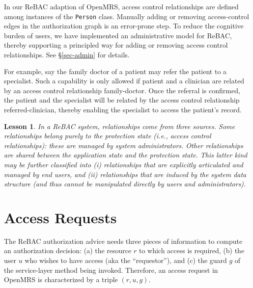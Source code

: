 \documentclass{acm_proc_article-sp}
\newcommand{\textcode}[1]{\texttt{#1}}
\newtheorem{lesson}{Lesson}
\begin{document}
\begin{compactenum}
  In our ReBAC adaption of OpenMRS, access control relationships are
  defined among instances of the \textcode{Person} class.  Manually
  adding or removing access-control edges in the authorization graph
  is an error-prone step.  To reduce the cognitive burden of users, we
  have implemented an administrative model for ReBAC, thereby
  supporting a principled way for adding or removing access control
  relationships.  See \S \ref{sec-admin} for details.

  For example, say the family doctor of a patient may refer the
  patient to a specialist.  Such a capability is only allowed if
  patient and a clinician are related by an access control relationship
  \textsf{family-doctor}.  Once the referral is confirmed, the patient
  and the specialist will be related by the access control
  relationship \textsf{referred-clinician}, thereby enabling the
  specialist to access the patient's record.
\end{compactenum}
\begin{lesson}
  In a ReBAC system, relationships come from three sources.  Some
  relationships belong purely to the protection state (i.e., access
  control relationships): these are managed by system administrators.
  Other relationships are shared between the application state and the
  protection state.  This latter kind may be further classified into
  (i) relationships that are explicitly articulated and managed by end
  users, and (ii) relationships that are induced by the system data
  structure (and thus cannot be manipulated directly by users and
  administrators).
\end{lesson}

\section{Access Requests}
\label{sec-request}


The ReBAC authorization advice needs three pieces of information to
compute an authorization decision: (a) the resource $r$ to which
access is required, (b) the user $u$ who wishes to have access (aka
the ``requestor''), and (c) the guard $g$ of the service-layer method
being invoked.  Therefore, an access request in OpenMRS is
characterized by a triple $(r, u, g)$.
\end{document}
